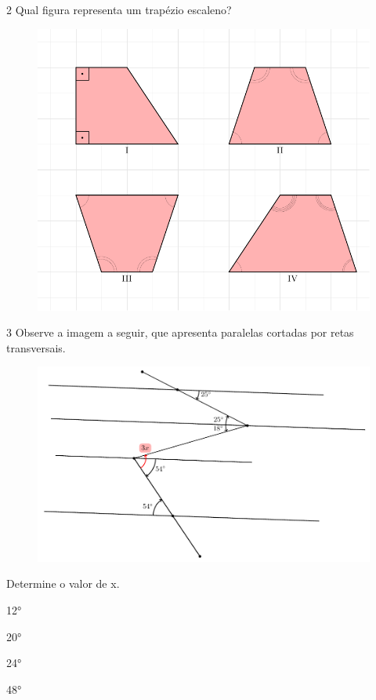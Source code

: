 \num{2} Qual figura representa um trapézio escaleno?

\begin{figure}[htpb!]
\centering
\includegraphics[width=.6\textwidth]{./tikz/028.pdf}
\end{figure}

\pagebreak

\num{3} Observe a imagem a seguir, que apresenta paralelas cortadas por retas
transversais.

\begin{figure}[htpb!]
\centering
\includegraphics[width=\textwidth]{./tikz/027.pdf}
\end{figure}

Determine o valor de x.

\begin{escolha}
  \item 12°

  \item 20°

  \item 24°

  \item 48°
\end{escolha}


